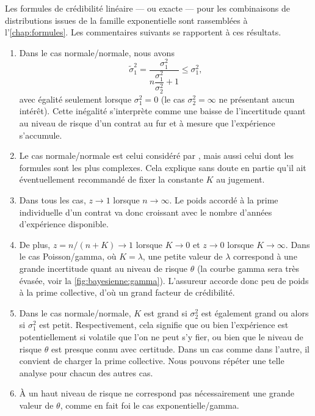Les formules de crédibilité linéaire --- ou exacte --- pour les
combinaisons de distributions issues de la famille exponentielle sont
rassemblées à l'\autoref{chap:formules}. Les commentaires suivants se
rapportent à ces résultats.

\begin{enumerate}
\item Dans le cas normale/normale, nous avons
  \begin{equation*}
    \tilde{\sigma}_1^2 =
      \frac{\sigma_1^2}{n \dfrac{\sigma_1^2}{\sigma_2^2} + 1}
    \le \sigma_1^2,
  \end{equation*}
  avec égalité seulement lorsque $\sigma_1^2 = 0$ (le cas $\sigma_2^2
  = \infty$ ne présentant aucun intérêt). Cette inégalité s'interprète
  comme une baisse de l'incertitude quant au niveau de risque d'un
  contrat au fur et à mesure que l'expérience s'accumule.

\item Le cas normale/normale est celui considéré par
  \cite{Whitney:1918}, mais aussi celui dont les formules sont les
  plus complexes. Cela explique sans doute en partie qu'il ait
  éventuellement recommandé de fixer la constante $K$ au jugement.

\item Dans tous les cas, $z \rightarrow 1$ lorsque $n \rightarrow
  \infty$.  Le poids accordé à la prime individuelle d'un contrat va
  donc croissant avec le nombre d'années d'expérience disponible.

\item De plus, $z = n/(n + K) \rightarrow 1$ lorsque $K \rightarrow 0$
  et $z \rightarrow 0$ lorsque $K \rightarrow \infty$. Dans le cas
  Poisson/gamma, où $K = \lambda$, une petite valeur de $\lambda$
  correspond à une grande incertitude quant au niveau de risque
  $\theta$ (la courbe gamma sera très évasée, voir la
  \autoref{fig:bayesienne:gamma}). L'assureur accorde donc peu de
  poids à la prime collective, d'où un grand facteur de crédibilité.

\item Dans le cas normale/normale, $K$ est grand si $\sigma_2^2$ est
  également grand ou alors si $\sigma_1^2$ est petit. Respectivement,
  cela signifie que ou bien l'expérience est potentiellement si
  volatile que l'on ne peut s'y fier, ou bien que le niveau de risque
  $\theta$ est presque connu avec certitude. Dans un cas comme dans
  l'autre, il convient de charger la prime collective. Nous pouvons
  répéter une telle analyse pour chacun des autres cas.

\item À un haut niveau de risque ne correspond pas nécessairement une
  grande valeur de $\theta$, comme en fait foi le cas
  exponentielle/gamma.
\end{enumerate}


